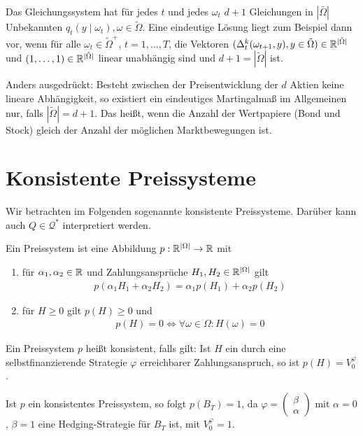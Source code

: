 \documentclass[a4paper,twoside,DIV15,BCOR12mm]{scrbook}
\begin{document}
\begin{bemerkung}
Das Gleichungssystem hat für jedes $t$ und jedes $\omega_t$ $d+1$ Gleichungen in $|\bar\Omega|$ Unbekannten $q_t(y\mid \omega_t),\omega\in \tilde\Omega$. Eine eindeutige Lösung liegt zum Beispiel dann vor, wenn für alle $\omega_t\in \tilde\Omega^+$, $t=1,\ldots,T$, die Vektoren $(\Delta_t^k(\omega_{t+1},y), y\in \tilde\Omega)\in \mathbb{R}^{|\tilde\Omega|}$ und $(1,\ldots,1)\in\mathbb{R}^{|\tilde\Omega|}$ linear unabhängig sind und $d+1=|\tilde\Omega|$ ist.

Anders ausgedrückt: Besteht zwischen der Preisentwicklung der $d$ Aktien keine lineare Abhängigkeit, so existiert ein eindeutiges Martingalmaß im Allgemeinen nur, falls $|\tilde\Omega|=d+1$. Das heißt, wenn die Anzahl der Wertpapiere (Bond und Stock) gleich der Anzahl der möglichen Marktbewegungen ist.
\end{bemerkung}

\section{Konsistente Preissysteme}

Wir betrachten im Folgenden sogenannte konsistente Preissysteme. Darüber kann auch $Q\in \mathcal Q^*$ interpretiert werden.

\begin{definition}
Ein Preissystem ist eine Abbildung $p:\mathbb{R}^{|\Omega|} \to \mathbb{R}$ mit
\begin{enumerate}
\item für $\alpha_1,\alpha_2\in \mathbb{R}$ und Zahlungsansprüche $H_1,H_2\in \mathbb{R}^{|\Omega|}$ gilt
\begin{align*}
p(\alpha_1H_1+\alpha_2H_2) = \alpha_1p(H_1) + \alpha_2p(H_2) \tag{„Linearität“}
\end{align*}
\item für $H\ge 0$ gilt $p(H) \ge 0$ und
\begin{align*}
p(H) = 0 \iff \forall \omega\in \Omega: H(\omega) = 0 \tag{„Positivität“}
\end{align*}
\end{enumerate}
Ein Preissystem $p$ heißt konsistent, falls gilt: Ist $H$ ein durch eine selbstfinanzierende Strategie $\varphi$ erreichbarer Zahlungsanspruch, so ist $p(H) = V_0^\varphi$.
\end{definition}

\begin{bemerkung}
Ist $p$ ein konsistentes Preissystem, so folgt $p(B_T)=1$, da 
$\varphi=\left(\begin{smallmatrix} \beta \\ \alpha \end{smallmatrix}\right)$
mit $\alpha=0$, $\beta=1$ eine Hedging-Strategie für $B_T$ ist, mit $V_0^\varphi =1$.
\end{bemerkung}
\end{document}
